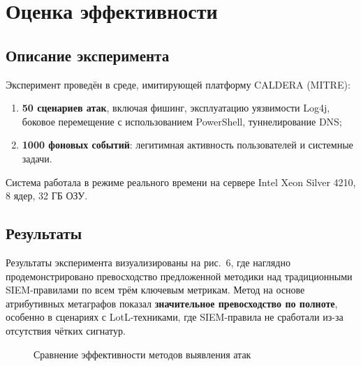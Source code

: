 \documentclass[12pt,a4paper]{extarticle}
\begin{document}
\section{Оценка эффективности}

\subsection{Описание эксперимента}

Эксперимент проведён в среде, имитирующей платформу CALDERA (MITRE):
\begin{enumerate}
    \item \textbf{50 сценариев атак}, включая фишинг, эксплуатацию уязвимости Log4j, боковое перемещение с использованием PowerShell, туннелирование DNS;
    \item \textbf{1000 фоновых событий}: легитимная активность пользователей и системные задачи.
\end{enumerate}
Система работала в режиме реального времени на сервере Intel Xeon Silver 4210, 8 ядер, 32 ГБ ОЗУ.

\subsection{Результаты}

Результаты эксперимента визуализированы на рис.~6, где наглядно продемонстрировано превосходство предложенной методики над традиционными SIEM-правилами по всем трём ключевым метрикам. Метод на основе атрибутивных метаграфов показал \textbf{значительное превосходство по полноте}, особенно в сценариях с LotL-техниками, где SIEM-правила не сработали из-за отсутствия чётких сигнатур.

\begin{figure}[ht]
\centering
{}
\caption{Сравнение эффективности методов выявления атак}
\label{fig:results}
\end{figure}
\end{document}
